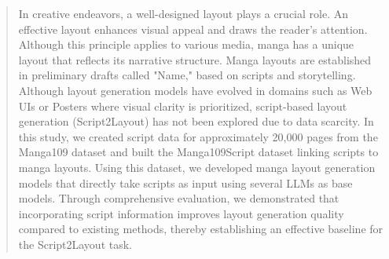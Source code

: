 \documentclass[sigconf, screen, review, anonymous]{acmart}
\begin{document}
\begin{abstract}
  In creative endeavors, a well-designed layout plays a crucial role. An effective layout enhances visual appeal and draws the reader's attention. Although this principle applies to various media, manga has a unique layout that reflects its narrative structure. Manga layouts are established in preliminary drafts called "Name," based on scripts and storytelling. Although layout generation models have evolved in domains such as Web UIs or Posters where visual clarity is prioritized, script-based layout generation (Script2Layout) has not been explored due to data scarcity. In this study, we created script data for approximately 20,000 pages from the Manga109 dataset and built the Manga109Script dataset linking scripts to manga layouts. Using this dataset, we developed manga layout generation models that directly take scripts as input using several LLMs as base models. Through comprehensive evaluation, we demonstrated that incorporating script information improves layout generation quality compared to existing methods, thereby establishing an effective baseline for the Script2Layout task.
\end{abstract}

\end{document}
